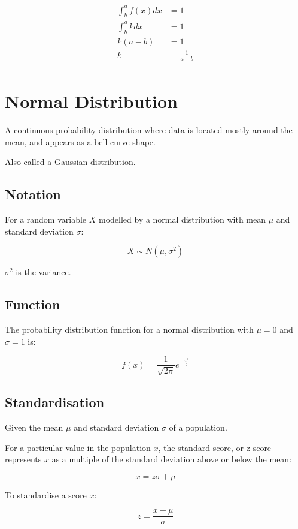 \documentclass[a4paper,11pt]{article}
\begin{document}
$$
\begin{aligned}
\int_b^a f(x) dx & = 1 \\
\int_b^a k dx & = 1 \\
k(a - b) & = 1 \\
k & = \frac{1}{a - b} \\
\end{aligned}
$$




\section{Normal Distribution}

A continuous probability distribution where data is located mostly around the
mean, and appears as a bell-curve shape.

Also called a Gaussian distribution.


\subsection{Notation}

For a random variable $X$ modelled by a normal distribution with mean $\mu$ and
standard deviation $\sigma$:

$$
X \sim N(\mu, \sigma^2)
$$

$\sigma^2$ is the variance.


\subsection{Function}

The probability distribution function for a normal distribution with $\mu = 0$
and $\sigma = 1$ is:

$$
f(x) = \frac{1}{\sqrt{2 \pi}} e^{-\frac{x^2}{2}}
$$


\subsection{Standardisation}

Given the mean $\mu$ and standard deviation $\sigma$ of a population.

For a particular value in the population $x$, the standard score, or z-score
represents $x$ as a multiple of the standard deviation above or below the mean:

$$
x = z\sigma + \mu
$$

To standardise a score $x$:

$$
z = \frac{x - \mu}{\sigma}
$$
\end{document}

